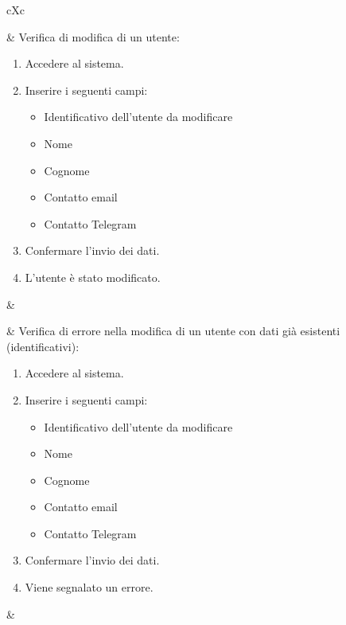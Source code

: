 \begin{table}[H]
	\begin{VTtable}[1.7]{\textwidth}{cXc}
        
        \addtotv & Verifica di modifica di un utente:
		\begin{enumerate}
			\item Accedere al sistema.
            \item Inserire i seguenti campi:
                \begin{itemize}
                    \item Identificativo dell'utente da modificare
                    \item Nome
                    \item Cognome
                    \item Contatto email
                    \item Contatto Telegram
                \end{itemize}
            \item Confermare l'invio dei dati.
            \item L'utente è stato modificato.
		\end{enumerate}
		& \TNI \\\midrule
        
        \addtotv & Verifica di errore nella modifica di un utente con dati già esistenti (identificativi):
		\begin{enumerate}
			\item Accedere al sistema.
            \item Inserire i seguenti campi:
                \begin{itemize}
                    \item Identificativo dell'utente da modificare
                    \item Nome
                    \item Cognome
                    \item Contatto email
                    \item Contatto Telegram
                \end{itemize}
            \item Confermare l'invio dei dati.
            \item Viene segnalato un errore.
		\end{enumerate}
		& \TNI \\\midrule
        

\end{VTtable}
\end{table}
